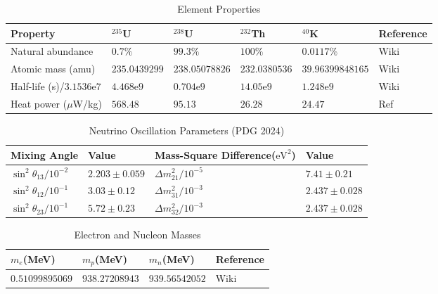 				\begin{table}[H]
					\centering
					\caption{Element Properties}
					\begin{tabular}{p{3.5cm}|p{2cm}p{2cm}p{2cm}p{3cm}|p{2cm}}
						\hline
						\hline
						Property & ${}^{235}$U & ${}^{238}$U & ${}^{232}$Th & ${}^{40}$K & Reference\\
						\hline
						Natural abundance & $0.7\%$ & $99.3\%$ & $100\%$ & $0.0117\%$ & Wiki\\
						\hline
						Atomic mass (amu) & $235.0439299$& $238.05078826$ & $232.0380536$ & $39.96399848165$ & Wiki \\
						\hline
						Half-life (s)/$3.1536$e$7$ & $4.468$e$9$ & $0.704$e$9$ & $14.05$e$9$ & $1.248$e$9$ & Wiki \\
						\hline
						Heat power ($\mu$W/kg) & $568.48$ & $95.13$ & $26.28$ & $24.47$ & Ref \cite{dye2012geoneutrinos}\\
						\hline
						\hline
					\end{tabular}
					\label{Table: Element Properties}
				\end{table}
				\begin{table}[H]
					\centering
					\caption{Neutrino Oscillation Parameters (PDG 2024)}
					\begin{tabular}{p{2.5cm}|p{3cm}|p{5cm}|p{3cm}}
						\hline
						\hline
						Mixing Angle & Value & Mass-Square Difference($\text{eV}^2$) & Value\\
						\hline
						$\sin^2 \theta_{13}/10^{-2}$ & $2.203\pm 0.059$ & $\Delta m_{21}^2/10^{-5}$ & $7.41\pm 0.21$\\
						\hline
						$\sin^2 \theta_{12}/10^{-1}$ & $3.03\pm 0.12$ & $\Delta m_{31}^2/10^{-3}$ & $2.437\pm 0.028$\\
						\hline
						$\sin^2 \theta_{23}/10^{-1}$ & $5.72\pm 0.23$ & $\Delta m_{32}^2/10^{-3}$ & $2.437\pm 0.028$\\
						\hline
						\hline
					\end{tabular}
					\label{Table: Oscillation Parameters}
				\end{table}
				\begin{table}[H]
					\centering
					\caption{Electron and Nucleon Masses}
					\begin{tabular}{p{3cm}p{3cm}p{3cm}|p{3cm}}
						\hline
						\hline
						$m_e$(MeV) & $m_p$(MeV) & $m_n$(MeV) & Reference\\
						\hline
						$0.51099895069$ & $938.27208943$ & $939.56542052$ & Wiki\\
						\hline
						\hline
					\end{tabular}
					\label{Table: Electron and Nucleon Mass}
				\end{table}
